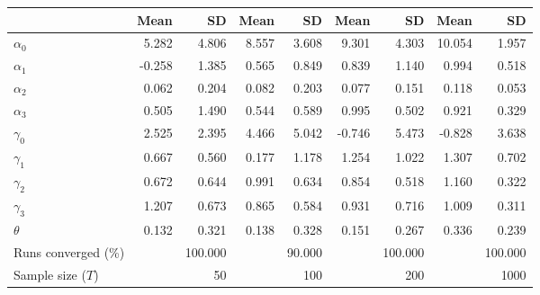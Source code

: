 
\begin{tabular}[t]{lrrrrrrrr}
\toprule
  & Mean & SD & Mean  & SD  & Mean   & SD   & Mean    & SD   \\
\midrule
$\alpha_{0}$ & 5.282 & 4.806 & 8.557 & 3.608 & 9.301 & 4.303 & 10.054 & 1.957\\
$\alpha_{1}$ & -0.258 & 1.385 & 0.565 & 0.849 & 0.839 & 1.140 & 0.994 & 0.518\\
$\alpha_{2}$ & 0.062 & 0.204 & 0.082 & 0.203 & 0.077 & 0.151 & 0.118 & 0.053\\
$\alpha_{3}$ & 0.505 & 1.490 & 0.544 & 0.589 & 0.995 & 0.502 & 0.921 & 0.329\\
$\gamma_{0}$ & 2.525 & 2.395 & 4.466 & 5.042 & -0.746 & 5.473 & -0.828 & 3.638\\
$\gamma_{1}$ & 0.667 & 0.560 & 0.177 & 1.178 & 1.254 & 1.022 & 1.307 & 0.702\\
$\gamma_{2}$ & 0.672 & 0.644 & 0.991 & 0.634 & 0.854 & 0.518 & 1.160 & 0.322\\
$\gamma_{3}$ & 1.207 & 0.673 & 0.865 & 0.584 & 0.931 & 0.716 & 1.009 & 0.311\\
$\theta$ & 0.132 & 0.321 & 0.138 & 0.328 & 0.151 & 0.267 & 0.336 & 0.239\\
Runs converged (\%) &  & 100.000 &  & 90.000 &  & 100.000 &  & 100.000\\
Sample size ($T$) &  & 50 &  & 100 &  & 200 &  & 1000\\
\bottomrule
\end{tabular}
